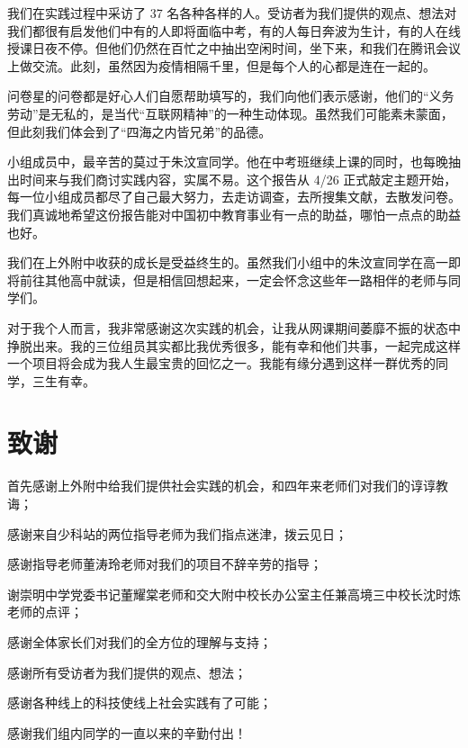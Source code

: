 \documentclass[12pt,UTF8]{ctexart}
\begin{document}
\par {
	我们在实践过程中采访了 37
	名各种各样的人。受访者为我们提供的观点、想法对我们都很有启发他们中有的人即将面临中考，有的人每日奔波为生计，有的人在线授课日夜不停。但他们仍然在百忙之中抽出空闲时间，坐下来，和我们在腾讯会议上做交流。此刻，虽然因为疫情相隔千里，但是每个人的心都是连在一起的。
}
\par {
	
	问卷星的问卷都是好心人们自愿帮助填写的，我们向他们表示感谢，他们的“义务劳动”是无私的，是当代“互联网精神”的一种生动体现。虽然我们可能素未蒙面，但此刻我们体会到了“四海之内皆兄弟”的品德。
}
\par {
	小组成员中，最辛苦的莫过于朱汶宣同学。他在中考班继续上课的同时，也每晚抽出时间来与我们商讨实践内容，实属不易。这个报告从 4/26
	正式敲定主题开始，每一位小组成员都尽了自己最大努力，去走访调查，去所搜集文献，去散发问卷。我们真诚地希望这份报告能对中国初中教育事业有一点的助益，哪怕一点点的助益也好。
}
\par {
	我们在上外附中收获的成长是受益终生的。虽然我们小组中的朱汶宣同学在高一即将前往其他高中就读，但是相信回想起来，一定会怀念这些年一路相伴的老师与同学们。
}
\par {
	
	对于我个人而言，我非常感谢这次实践的机会，让我从网课期间萎靡不振的状态中挣脱出来。我的三位组员其实都比我优秀很多，能有幸和他们共事，一起完成这样一个项目将会成为我人生最宝贵的回忆之一。我能有缘分遇到这样一群优秀的同学，三生有幸。
}

\newpage

\section{致谢}
首先感谢上外附中给我们提供社会实践的机会，和四年来老师们对我们的谆谆教诲；
\par {感谢来自少科站的两位指导老师为我们指点迷津，拨云见日；}
\par {感谢指导老师董涛玲老师对我们的项目不辞辛劳的指导；}
\par {谢崇明中学党委书记董耀棠老师和交大附中校长办公室主任兼高境三中校长沈时炼老师的点评；}
\par {感谢全体家长们对我们的全方位的理解与支持；}
\par {感谢所有受访者为我们提供的观点、想法；}
\par {感谢各种线上的科技使线上社会实践有了可能；}
\par {感谢我们组内同学的一直以来的辛勤付出！} 
\end{document}
